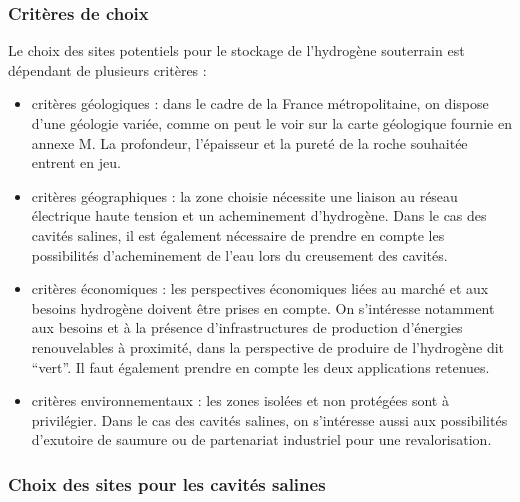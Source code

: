 \documentclass[11pt,french,a4paper]{article}
\begin{document}
\subsubsection{Critères de choix}
Le choix des sites potentiels pour le stockage de l’hydrogène souterrain est dépendant de plusieurs critères : 
\begin{itemize}
\item critères géologiques : dans le cadre de la France métropolitaine, on dispose d’une géologie variée, comme on peut le voir sur la carte géologique fournie en annexe M. La profondeur, l’épaisseur et la pureté de la roche souhaitée entrent en jeu.
\item critères géographiques : la zone choisie nécessite une liaison au réseau électrique haute tension et un acheminement d’hydrogène. Dans le cas des cavités salines, il est également nécessaire de prendre en compte les possibilités d’acheminement de l’eau lors du creusement des cavités.
\item critères économiques : les perspectives économiques liées au marché et aux besoins hydrogène doivent être prises en compte. On s’intéresse notamment aux besoins et à la présence d’infrastructures de production d’énergies renouvelables à proximité, dans la perspective de produire de l’hydrogène dit “vert”. Il faut également prendre en compte les deux applications retenues.
\item critères environnementaux : les zones isolées et non protégées sont à privilégier. Dans le cas des cavités salines, on s’intéresse aussi aux possibilités d’exutoire de saumure ou de partenariat industriel pour une revalorisation.
\end{itemize}

\subsubsection{Choix des sites pour les cavités salines}
\end{document}
